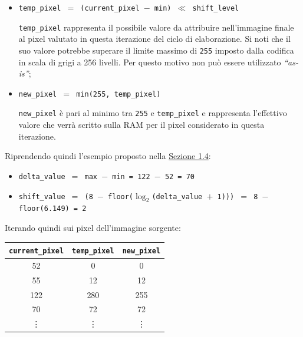 \documentclass{article}
\begin{document}
\begin{itemize}
    \item   \texttt{temp\_pixel $=$ (current\_pixel $-$ min) $\ll$ shift\_level}\par
          \texttt{temp\_pixel} rappresenta il possibile valore da attribuire nell’immagine finale al pixel valutato in questa iterazione del ciclo di elaborazione. Si noti che il suo valore potrebbe superare il limite massimo di \texttt{255} imposto dalla codifica in scala di grigi a 256 livelli. Per questo motivo non può essere utilizzato \emph{“as-is”};
    \item   \texttt{new\_pixel $=$ min(255, temp\_pixel)}\par
          \texttt{new\_pixel} è pari al minimo tra \texttt{255} e \texttt{temp\_pixel} e rappresenta l’effettivo valore che verrà scritto sulla RAM per il pixel considerato in questa iterazione.
\end{itemize}

Riprendendo quindi l'esempio proposto nella \hyperref[sec:esempio]{Sezione 1.4}:
\begin{itemize}
    \item   \texttt{delta\_value $=$ max $-$ min = 122 $-$ 52 = 70}
    \item   \texttt{shift\_value $=$ (8 $-$ floor($\log_{2} $(delta\_value $+$ 1))) $=$ 8 $-$ floor(6.149) = 2}
\end{itemize}

\clearpage

Iterando quindi sui pixel dell'immagine sorgente:
\vspace{-.1cm}
\begin{center}
    \small
    \def\arraystretch{1.2} %
    \begin{tabular}{||c|c|c||}
        \hline
        \texttt{current\_pixel} & \texttt{temp\_pixel} & \texttt{new\_pixel} \\
        \hline \hline
        52                      & 0                    & 0                   \\\hline
        55                      & 12                   & 12                  \\\hline
        122                     & 280                  & 255                 \\\hline
        70                      & 72                   & 72                  \\\hline
        \vdots                  & \vdots               & \vdots              \\\hline
    \end{tabular}
\end{center}
\vspace{.1cm}
\end{document}
